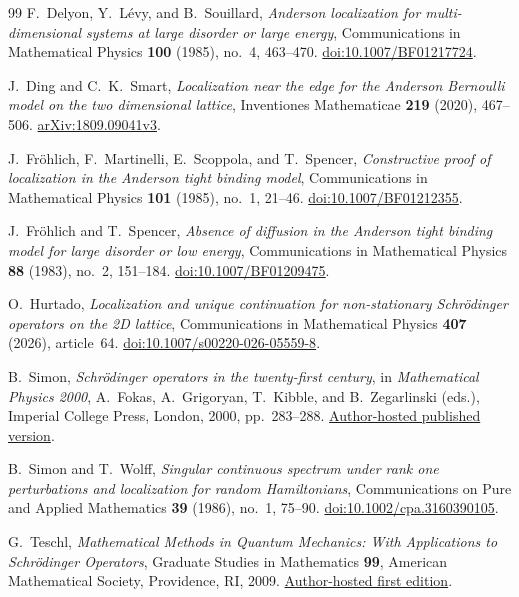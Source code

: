 \begin{thebibliography}{99}
F.~Delyon, Y.~L\'evy, and B.~Souillard,
\emph{Anderson localization for multi-dimensional systems at large
disorder or large energy},
Communications in Mathematical Physics \textbf{100} (1985), no.~4, 463--470.
\href{https://doi.org/10.1007/BF01217724}{doi:10.1007/BF01217724}.

J.~Ding and C.~K.~Smart,
\emph{Localization near the edge for the Anderson Bernoulli model on the
two dimensional lattice},
Inventiones Mathematicae \textbf{219} (2020), 467--506.
\href{https://arxiv.org/abs/1809.09041v3}{arXiv:1809.09041v3}.

J.~Fr\"ohlich, F.~Martinelli, E.~Scoppola, and T.~Spencer,
\emph{Constructive proof of localization in the Anderson tight binding model},
Communications in Mathematical Physics \textbf{101} (1985), no.~1, 21--46.
\href{https://doi.org/10.1007/BF01212355}{doi:10.1007/BF01212355}.

J.~Fr\"ohlich and T.~Spencer,
\emph{Absence of diffusion in the Anderson tight binding model for large
disorder or low energy},
Communications in Mathematical Physics \textbf{88} (1983), no.~2, 151--184.
\href{https://doi.org/10.1007/BF01209475}{doi:10.1007/BF01209475}.

O.~Hurtado,
\emph{Localization and unique continuation for non-stationary
Schr\"odinger operators on the 2D lattice},
Communications in Mathematical Physics \textbf{407} (2026), article~64.
\href{https://doi.org/10.1007/s00220-026-05559-8}{doi:10.1007/s00220-026-05559-8}.

B.~Simon,
\emph{Schr\"odinger operators in the twenty-first century},
in \emph{Mathematical Physics 2000},
A.~Fokas, A.~Grigoryan, T.~Kibble, and B.~Zegarlinski (eds.),
Imperial College Press, London, 2000, pp.~283--288.
\href{https://math.caltech.edu/SimonPapers/R40.pdf}{Author-hosted published version}.

B.~Simon and T.~Wolff,
\emph{Singular continuous spectrum under rank one perturbations and
localization for random Hamiltonians},
Communications on Pure and Applied Mathematics \textbf{39} (1986),
no.~1, 75--90.
\href{https://doi.org/10.1002/cpa.3160390105}{doi:10.1002/cpa.3160390105}.

G.~Teschl,
\emph{Mathematical Methods in Quantum Mechanics: With Applications to
Schr\"odinger Operators},
Graduate Studies in Mathematics \textbf{99},
American Mathematical Society, Providence, RI, 2009.
\href{https://www.mat.univie.ac.at/~gerald/ftp/book-schroe/schroe.pdf}{Author-hosted first edition}.

\end{thebibliography}
